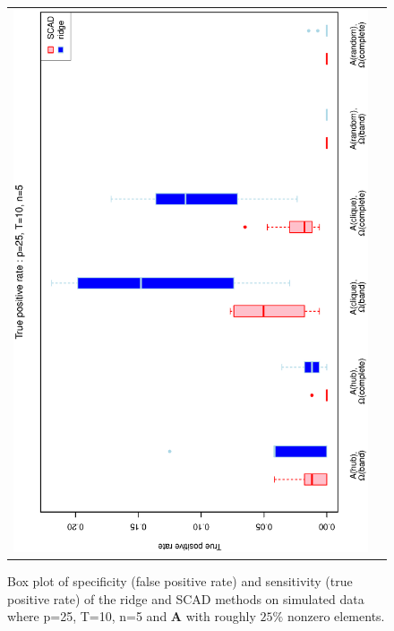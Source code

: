 \begin{figure}[h!]
\begin{tabular}{cc}
\includegraphics[scale=0.45,angle=270]{ROCtpr25T10N5_25.eps}
\end{tabular}
\caption{Box plot of specificity (false positive rate) and sensitivity (true positive rate) of the ridge and SCAD methods on simulated data where p=25, T=10,  n=5 and $\mathbf{A}$ with roughly $25\%$ nonzero elements.}
\label{figSM:RocP25T10N5_25}
\end{figure}



